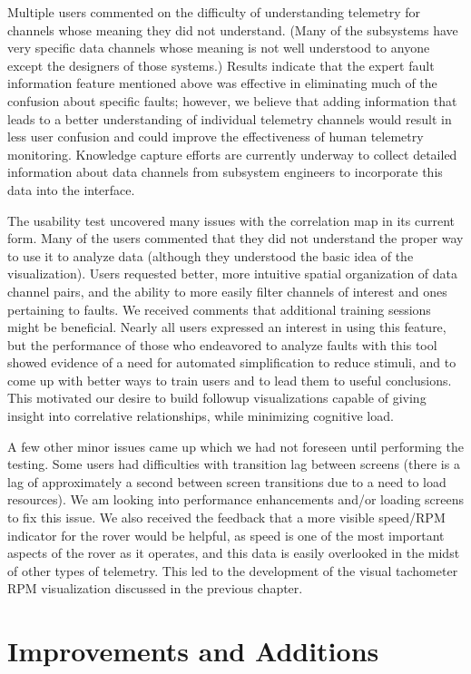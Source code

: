 Multiple users commented on the difficulty of understanding telemetry for channels whose meaning they did not understand. (Many of the subsystems have very specific data channels whose meaning is not well understood to anyone except the designers of those systems.) Results indicate that the expert fault information feature mentioned above was effective in eliminating much of the confusion about specific faults; however, we believe that adding information that leads to a better understanding of individual telemetry channels would result in less user confusion and could improve the effectiveness of human telemetry monitoring. Knowledge capture efforts are currently underway to collect detailed information about data channels from subsystem engineers to incorporate this data into the interface.

The usability test uncovered many issues with the correlation map in its current form. Many of the users commented that they did not understand the proper way to use it to analyze data (although they understood the basic idea of the visualization). Users requested better, more intuitive spatial organization of data channel pairs, and the ability to more easily filter channels of interest and ones pertaining to faults. We received comments that additional training sessions might be beneficial. Nearly all users expressed an interest in using this feature, but the performance of those who endeavored to analyze faults with this tool showed evidence of a need for automated simplification to reduce stimuli, and to come up with better ways to train users and to lead them to useful conclusions. This motivated our desire to build followup visualizations capable of giving insight into correlative relationships, while minimizing cognitive load.

A few other minor issues came up which we had not foreseen until performing the testing. Some users had difficulties with transition lag between screens (there is a lag of approximately a second between screen transitions due to a need to load resources). We am looking into performance enhancements and/or loading screens to fix this issue. We also received the feedback that a more visible speed/RPM indicator for the rover would be helpful, as speed is one of the most important aspects of the rover as it operates, and this data is easily overlooked in the midst of other types of telemetry. This led to the development of the visual tachometer RPM visualization discussed in the previous chapter.

\section{Improvements and Additions}

